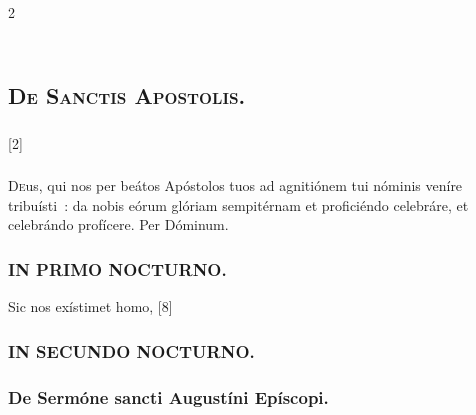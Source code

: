 \documentclass[9pt,twoside]{extarticle}
\begin{document}
\begin{multicols}{2}
{{{\subsection*{\center {}}
\subsection*{\center \textsc{\\ De Sanctis Apostolis.}}
\subsubsection*{\center {}}

\begin{tightlist}{}
\item {} [2] 
\end{tightlist}

\subsubsection*{\center {}}
\lettrine{D}eus, qui nos per beátos Apóstolos tuos ad agnitiónem tui nóminis veníre tribuísti~: da nobis eórum glóriam sempitérnam et proficiéndo celebráre, et celebrándo profícere. Per Dóminum.

\subsubsection*{\center \textsc{IN PRIMO NOCTURNO.}}
\begin{tightlist}{}
\item {} Sic nos exístimet homo,  [8]
\end{tightlist}

\subsubsection*{\center \textsc{IN SECUNDO NOCTURNO.}}

\subsubsection*{\center De Sermóne sancti Augustíni Epíscopi.}
}}}
\end{multicols}
\end{document}
